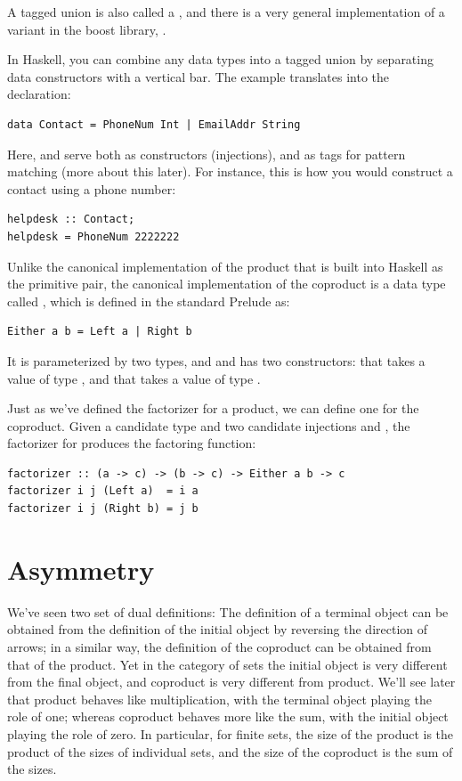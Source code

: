 A tagged union is also called a , and there is a very
general implementation of a variant in the boost library,
.

In Haskell, you can combine any data types into a tagged union by
separating data constructors with a vertical bar. The 
example translates into the declaration:

\begin{Verbatim}
data Contact = PhoneNum Int | EmailAddr String
\end{Verbatim}
Here,  and  serve both as
constructors (injections), and as tags for pattern matching (more about
this later). For instance, this is how you would construct a contact
using a phone number:

\begin{Verbatim}
helpdesk :: Contact;
helpdesk = PhoneNum 2222222
\end{Verbatim}
Unlike the canonical implementation of the product that is built into
Haskell as the primitive pair, the canonical implementation of the
coproduct is a data type called , which is defined in the
standard Prelude as:

\begin{Verbatim}
Either a b = Left a | Right b
\end{Verbatim}
It is parameterized by two types,  and  and has two
constructors:  that takes a value of type , and
 that takes a value of type .

Just as we've defined the factorizer for a product, we can define one
for the coproduct. Given a candidate type  and two candidate
injections  and , the factorizer for 
produces the factoring function:

\begin{Verbatim}
factorizer :: (a -> c) -> (b -> c) -> Either a b -> c
factorizer i j (Left a)  = i a
factorizer i j (Right b) = j b
\end{Verbatim}

\section{Asymmetry}

We've seen two set of dual definitions: The definition of a terminal
object can be obtained from the definition of the initial object by
reversing the direction of arrows; in a similar way, the definition of
the coproduct can be obtained from that of the product. Yet in the
category of sets the initial object is very different from the final
object, and coproduct is very different from product. We'll see later
that product behaves like multiplication, with the terminal object
playing the role of one; whereas coproduct behaves more like the sum,
with the initial object playing the role of zero. In particular, for
finite sets, the size of the product is the product of the sizes of
individual sets, and the size of the coproduct is the sum of the sizes.

